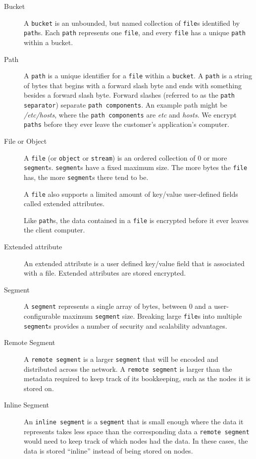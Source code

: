 \documentclass[11pt,fleqn,openany]{book}
\newcommand{\x}[1]{{\tt #1}} \newcommand{\code}[1]{{\em #1}}
\begin{document}
\begin{description}
\item[Bucket] A \x{bucket} is an unbounded, but named
collection of \x{file}s identified by \x{path}s. Each \x{path} represents one
\x{file}, and every \x{file} has a unique \x{path} within a bucket.

\item[Path] A \x{path} is a unique identifier for a \x{file} within a
\x{bucket}. A \x{path} is a string of bytes that begins with a forward
slash byte and ends with something besides a forward slash byte. Forward
slashes (referred to as the \x{path separator}) separate \x{path components}.
An example path might be \code{/etc/hosts}, where the \x{path components} are
\code{etc} and \code{hosts}.
We encrypt \x{paths} before they ever leave the customer's application's
computer.

\item[File or Object] A \x{file} (or \x{object} or \x{stream}) is an ordered
collection of 0 or more \x{segment}s. \x{segment}s have a fixed maximum size.
The more bytes the \x{file} has, the more \x{segment}s there tend to be.

A \x{file} also supports a limited amount of key/value user-defined fields
called extended attributes.

Like \x{path}s, the data contained in a \x{file} is encrypted before it ever
leaves the client computer.

\item[Extended attribute] An extended attribute is a user defined key/value
field that is associated with a file. Extended attributes are stored encrypted.

\item[Segment] A \x{segment} represents a single array of bytes, between 0 and a
user-configurable maximum \x{segment} size. Breaking large \x{file}s into
multiple \x{segment}s provides a number of security and scalability advantages.

\item[Remote Segment] A \x{remote segment} is a larger \x{segment} that will be
encoded and distributed across the network. A \x{remote segment} is larger than
the metadata required to keep track of its bookkeeping, such as the nodes it
is stored on.

\item[Inline Segment] An \x{inline segment} is a \x{segment} that is small
enough where the data it represents takes less space than the corresponding
data a \x{remote segment} would need to keep track of which nodes had the data.
In these cases, the data is stored ``inline'' instead of being stored on nodes.


\end{description}
\end{document}
